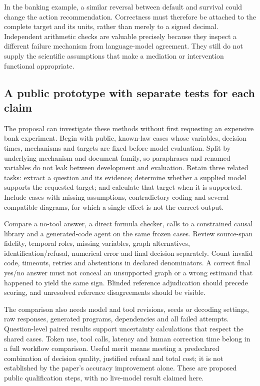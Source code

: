 In the banking example, a similar reversal between default and survival could
change the action recommendation. Correctness must therefore be attached to
the complete target and its units, rather than merely to a signed decimal.
Independent arithmetic checks are valuable precisely because they inspect a
different failure mechanism from language-model agreement. They still do not
supply the scientific assumptions that make a mediation or intervention
functional appropriate.

\subsection{A public prototype with separate tests for each claim}
\label{exec21:prophets-validation}
The proposal can investigate these methods without first requesting an expensive
bank experiment. Begin with public, known-law cases whose variables, decision
times, mechanisms and targets are fixed before model evaluation. Split by
underlying mechanism and document family, so paraphrases and renamed variables
do not leak between development and evaluation. Retain three related tasks:
extract a question and its evidence; determine whether a supplied model supports
the requested target; and calculate that target when it is supported. Include
cases with missing assumptions, contradictory coding and several compatible
diagrams, for which a single effect is not the correct output.

Compare a no-tool answer, a direct formula checker, calls to a constrained
causal library and a generated-code agent on the same frozen cases. Review
source-span fidelity, temporal roles, missing variables, graph alternatives,
identification/refusal, numerical error and final decision separately. Count
invalid code, timeouts, retries and abstentions in declared denominators. A
correct final yes/no answer must not conceal an unsupported graph or a wrong
estimand that happened to yield the same sign. Blinded reference adjudication
should precede scoring, and unresolved reference disagreements should be visible.

The comparison also needs model and tool revisions, seeds or decoding settings,
raw responses, generated programs, dependencies and all failed attempts.
Question-level paired results support uncertainty calculations that respect the
shared cases. Token use, tool calls, latency and human correction time belong
in a full workflow comparison. Useful merit means meeting a predeclared
combination of decision quality, justified refusal and total cost; it is not
established by the paper's accuracy improvement alone. These are proposed
public qualification steps, with no live-model result claimed here.

